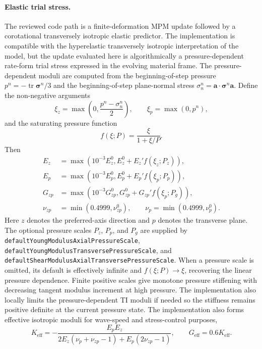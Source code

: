 \paragraph{Elastic trial stress.}
The reviewed code path is a finite-deformation MPM update followed by a corotational transversely isotropic elastic predictor.  The implementation is compatible with the hyperelastic transversely isotropic interpretation of the model, but the update evaluated here is algorithmically a pressure-dependent rate-form trial stress expressed in the evolving material frame.  The pressure-dependent moduli are computed from the beginning-of-step pressure \(p^n=-\operatorname{tr}\boldsymbol{\sigma}^n/3\) and the beginning-of-step plane-normal stress \(\sigma_n^n=\mathbf a\cdot\boldsymbol{\sigma}^n\mathbf a\).  Define the non-negative arguments
\begin{equation}
  \xi_z = \max\left(0,\frac{p^n-\sigma_n^n}{2}\right),
  \qquad
  \xi_p = \max(0,p^n),
  \label{eq:graphite-elastic-pressure-arguments}
\end{equation}
and the saturating pressure function
\begin{equation}
  f(\xi;P)=\frac{\xi}{1+\xi/P}.
  \label{eq:graphite-saturating-pressure-function}
\end{equation}
Then
\begin{align}
  E_z &= \max\left(10^{-3}E_z^0,
       E_z^0 + E_z' f(\xi_z;P_z)\right),\\
  E_p &= \max\left(10^{-3}E_p^0,
       E_p^0 + E_p' f(\xi_p;P_p)\right),\\
  G_{zp} &= \max\left(10^{-3}G_{zp}^0,
       G_{zp}^0 + G_{zp}' f(\xi_p;P_g)\right),\\
  \nu_{zp} &= \min(0.4999,\nu_{zp}^0),
  \qquad
  \nu_p = \min(0.4999,\nu_p^0).
  \label{eq:graphite-pressure-dependent-moduli}
\end{align}
Here \(z\) denotes the preferred-axis direction and \(p\) denotes the transverse plane.  The optional pressure scales \(P_z\), \(P_p\), and \(P_g\) are supplied by \texttt{defaultYoungModulusAxialPressureScale}, \texttt{defaultYoungModulusTransversePressureScale}, and \texttt{defaultShearModulusAxialTransversePressureScale}.  When a pressure scale is omitted, its default is effectively infinite and \(f(\xi;P)\to\xi\), recovering the linear pressure dependence.  Finite positive scales give monotone pressure stiffening with decreasing tangent modulus increment at high pressure.  The implementation also locally limits the pressure-dependent TI moduli if needed so the stiffness remains positive definite at the current pressure state.  The implementation also forms effective isotropic moduli for wave-speed and stress-control purposes,
\begin{equation}
  K_{\mathrm{eff}} =
  -\frac{E_pE_z}{2E_z(\nu_p+\nu_{zp}-1)+E_p(2\nu_{zp}-1)},
  \qquad
  G_{\mathrm{eff}} = 0.6K_{\mathrm{eff}}.
  \label{eq:graphite-effective-moduli}
\end{equation}

